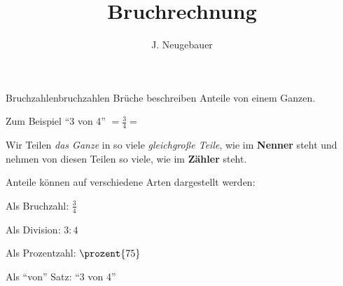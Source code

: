 \documentclass[12pt,a5paper,landscape]{scrartcl}
\author{J. Neugebauer}
\title{Bruchrechnung}
\date{\Heute}
\begin{document}
	\begin{hilfekarte}{Bruchzahlen}{bruchzahlen}
		Brüche beschreiben Anteile von einem Ganzen.
		
		Zum Beispiel \enquote{3 von 4} $= \frac{3}{4} =$ 
		
		\begin{tikzpicture}
				
		\end{tikzpicture}
		
		Wir Teilen \emph{das Ganze} in so viele \emph{gleichgroße Teile}, wie im \textbf{Nenner} steht und nehmen von diesen Teilen so viele, wie im \textbf{Zähler} steht.
		
		\vspace{1cm}
		Anteile können auf verschiedene Arten dargestellt werden:
		\begin{multicols}{2}
			Als Bruchzahl: $\frac{3}{4}$
			
			\bigskip
			Als Division: $3:4$
			
			Als Prozentzahl: $\prozent{75}$
			
			\bigskip
			Als \enquote{von} Satz: \enquote{3 von 4}
		\end{multicols}
	\end{hilfekarte}
		
\end{document}

